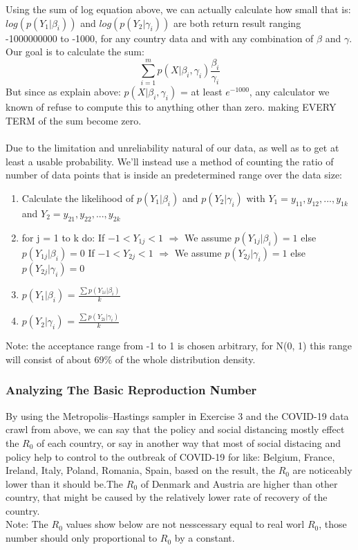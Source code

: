 \documentclass[a4paper]{article}
\begin{document}
    Using the sum of log equation above, we can actually calculate how small that is: $log(p(Y_1|\beta_i))$ and $log(p(Y_2|\gamma_i))$ are both return result ranging -1000000000 to -1000, for any country data and with any combination of $\beta$ and $\gamma$.\\
    Our goal is to calculate the sum:
    $$\sum_{i=1}^m p(X | \beta_i ,\gamma_i) \frac{\beta_i}{\gamma_i}$$
    But since as explain above: $p(X | \beta_i ,\gamma_i)$ = at least $e^{-1000}$, any calculator we known of refuse to compute this to anything other than zero. making EVERY TERM of the sum become zero.
    \\ \\
    Due to the limitation and unreliability natural of our data, as well as to get at least a usable probability. We'll instead use a method of counting the ratio of number of data points that is inside an predetermined range over the data size:
    \begin{enumerate}
        \item Calculate the likelihood of $p(Y_1|\beta_i)$ and $p(Y_2|\gamma_i)$ with $Y_1 = {y_{11},y_{12},...,y_{1k}}$ and $Y_2 = {y_{21},y_{22},...,y_{2k}}$
        \item for j = 1 to k do:
        \subitem If $-1 < Y_{1j} < 1 $ $\Rightarrow$ We assume $p(Y_{1j}|\beta_i) = 1$ else $p(Y_{1j}|\beta_i) = 0$
        \subitem If $-1 < Y_{2j} < 1 $ $\Rightarrow$ We assume $p(Y_{2j}|\gamma_i) = 1$ else $p(Y_{2j}|\gamma_i) = 0$
        \item $p(Y_1|\beta_i)$ = $\frac{\sum p(Y_{1i}|\beta_i)}{k}$ 
        \item $p(Y_2|\gamma_i)$ = $\frac{\sum p(Y_{2i}|\gamma_i)}{k}$ 
    \end{enumerate}
    Note: the acceptance range from -1 to 1 is chosen arbitrary, for N(0, 1) this range will consist of about 69\% of the whole distribution density.
    
    \subsubsection{Analyzing The Basic Reproduction Number}
    By using the Metropolis–Hastings sampler in Exercise 3 and the COVID-19 data crawl from above, we can say that the policy and social distancing mostly effect the $R_0$ of each country, or say in another way that most of social distacing and policy help to control to the outbreak of COVID-19 for like: Belgium, France, Ireland, Italy, Poland, Romania, Spain, based on the result, the $R_0$ are noticeably lower than it should be.The $R_0$ of Denmark and Austria are higher than other country, that might be caused by the relatively lower rate of recovery of the country.
    \\
    Note: The $R_0$ values show below are not nesscessary equal to real worl $R_0$, those number should only proportional to $R_0$ by a constant.
    
\end{document}

